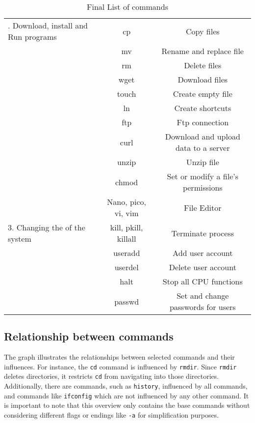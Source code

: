 \begin{table}[H]
\begin{tabular}{|>{\centering\arraybackslash}p{3cm}|c|c|}
         2. Download, install and Run programs & cp & Copy files\\
         & mv & Rename and replace file\\
         & rm & Delete files\\
         & wget & Download files\\
         & touch & Create empty file\\
         & ln & Create shortcuts\\
         & ftp & Ftp connection\\
         & curl & Download and upload data to a server\\
         & unzip & Unzip file\\
         & chmod & Set or modify a file's permissions\\
         & Nano, pico, vi, vim & File Editor\\ \hline
         
         3. Changing the of the system & kill, pkill, killall & Terminate process\\
         & useradd & Add user account\\
         & userdel & Delete user account\\
         & halt & Stop all CPU functions\\
         & passwd & Set and change passwords for users\\ \hline

    \end{tabular}
    \caption{Final List of commands}
    \label{tab:my_label}
\end{table}


\subsection{Relationship between commands}


The graph illustrates the relationships between selected commands and their influences. For instance, the \texttt{cd} command is influenced by \texttt{rmdir}. Since \texttt{rmdir} deletes directories, it restricts \texttt{cd} from navigating into those directories. Additionally, there are commands, such as \texttt{history}, influenced by all commands, and commands like \texttt{ifconfig} which are not influenced by any other command. It is important to note that this overview only contains the base commands without considering different flags or endings like \texttt{-a} for simplification purposes. 

